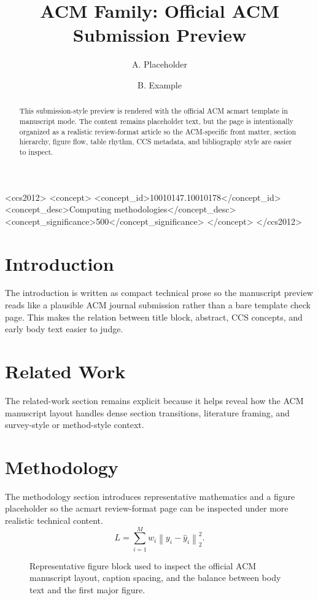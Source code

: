 \documentclass[manuscript]{acmart}
\title{ACM Family: Official ACM Submission Preview}
\author{A. Placeholder}
\affiliation{%
  \institution{Department of Verified Templates, Placeholder Institute}
  \city{Placeholder City}
  \country{Country}
}
\author{B. Example}
\affiliation{%
  \institution{Journal Systems Lab, Example University}
  \city{Example City}
  \country{Country}
}
\begin{document}
\begin{abstract}
This submission-style preview is rendered with the official ACM acmart template in manuscript mode. The content remains placeholder text, but the page is intentionally organized as a realistic review-format article so the ACM-specific front matter, section hierarchy, figure flow, table rhythm, CCS metadata, and bibliography style are easier to inspect.
\end{abstract}
\begin{CCSXML}
<ccs2012>
<concept>
<concept_id>10010147.10010178</concept_id>
<concept_desc>Computing methodologies</concept_desc>
<concept_significance>500</concept_significance>
</concept>
</ccs2012>
\end{CCSXML}
\maketitle
\section{Introduction}
The introduction is written as compact technical prose so the manuscript preview reads like a plausible ACM journal submission rather than a bare template check page. This makes the relation between title block, abstract, CCS concepts, and early body text easier to judge.
\section{Related Work}
The related-work section remains explicit because it helps reveal how the ACM manuscript layout handles dense section transitions, literature framing, and survey-style or method-style context.
\section{Methodology}
The methodology section introduces representative mathematics and a figure placeholder so the acmart review-format page can be inspected under more realistic technical content.
\begin{equation}
L = \sum_{i=1}^{M} w_i \left\| y_i - \hat{y}_i \right\|_2^2.
\end{equation}
\begin{figure}[t]
\centering
{}
\caption{Representative figure block used to inspect the official ACM manuscript layout, caption spacing, and the balance between body text and the first major figure.}
\end{figure}
\end{document}
